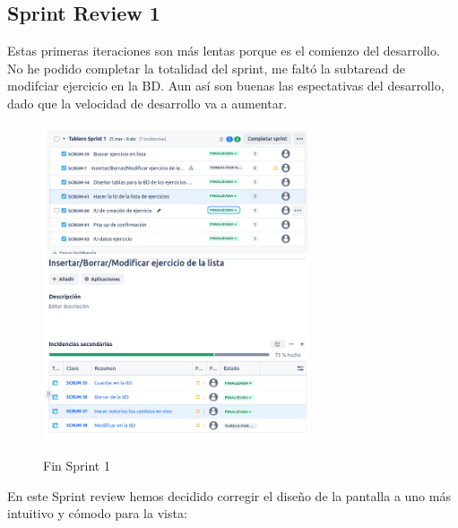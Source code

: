 \subsection{Sprint Review 1}
Estas primeras iteraciones son más lentas porque es el comienzo del desarrollo. No he podido completar la totalidad del sprint, me faltó la subtaread de modifciar ejercicio en la BD. Aun así son buenas las espectativas del desarrollo, dado que la velocidad de desarrollo va a aumentar.

\begin{figure}[h!]
  \centering
  \includegraphics[width=0.7\textwidth]{fotos/PostSprint1.png}
  \includegraphics[width=0.7\textwidth]{fotos/SubListPost1.png}
  \caption{Fin Sprint 1}
  \label{fig:imagen}
\end{figure}

En este Sprint review hemos decidido corregir el diseño de la pantalla a uno más intuitivo y cómodo para la vista:

